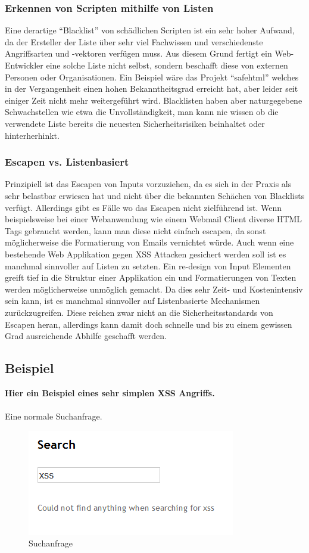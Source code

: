 \subsubsection{Erkennen von Scripten mithilfe von Listen}
Eine derartige ``Blacklist'' von sch\"adlichen Scripten ist ein sehr hoher Aufwand, da der Ersteller der Liste \"uber sehr viel Fachwissen und verschiedenste Angriffsarten und -vektoren verf\"ugen muss. Aus diesem Grund fertigt ein Web-Entwickler eine solche Liste nicht selbst, sondern beschafft diese von externen Personen oder Organisationen. Ein Beispiel w\"are das Projekt ``safehtml'' welches in der Vergangenheit einen hohen Bekanntheitsgrad erreicht hat, aber leider seit einiger Zeit nicht mehr weitergef\"uhrt wird. Blacklisten haben aber naturgegebene Schwachstellen wie etwa die Unvollst\"andigkeit, man kann nie wissen ob die verwendete Liste bereits die neuesten Sicherheitsrisiken beinhaltet oder hinterherhinkt.
\cite{xssBuch}

\subsubsection{Escapen vs. Listenbasiert}
Prinzipiell ist das Escapen von Inputs vorzuziehen, da es sich in der Praxis als sehr belastbar erwiesen hat und nicht \"uber die bekannten Sch\"achen von Blacklists verf\"ugt. Allerdings gibt es F\"alle wo das Escapen nicht zielf\"uhrend ist. Wenn beispielsweise bei einer Webanwendung wie einem Webmail Client diverse HTML Tags gebraucht werden, kann man diese nicht einfach escapen, da sonst m\"oglicherweise die Formatierung von Emails vernichtet w\"urde. Auch wenn eine bestehende Web Applikation gegen XSS Attacken gesichert werden soll ist es manchmal sinnvoller auf Listen zu setzten. Ein re-design von Input Elementen greift tief in die Struktur einer Applikation ein und Formatierungen von Texten werden m\"oglicherweise unm\"oglich gemacht. Da dies sehr Zeit- und Kostenintensiv sein kann, ist es manchmal sinnvoller auf Listenbasierte Mechanismen zur\"uckzugreifen. Diese reichen zwar nicht an die Sicherheitsstandards von Escapen heran, allerdings kann damit doch schnelle und bis zu einem gewissen Grad ausreichende Abhilfe geschafft werden.
\cite{xssBuch}

\clearpage
\subsection{Beispiel}
\textbf{Hier ein Beispiel eines sehr simplen XSS Angriffs.}\\\\
Eine normale Suchanfrage.
\begin{figure}[H]
	\begin{center}
		\includegraphics[width=0.3\linewidth]{images/xss1.png}
		\caption{Suchanfrage}
		\label{titel}
	\end{center}
\end{figure}

